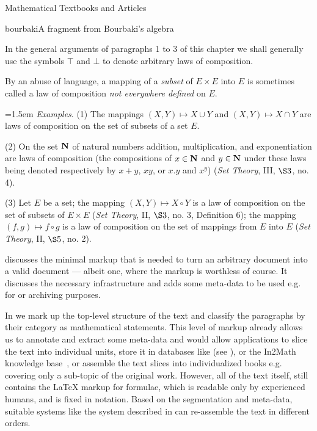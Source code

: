 \begin{tchapter}[id=algebra,short=Textbooks and Articles]{Mathematical Textbooks and Articles}
\begin{myfig}{bourbaki}{A fragment from Bourbaki's algebra~}
{\begin{minipage}{11cm}
      In the general arguments of paragraphs 1 to 3 of this chapter we shall generally use
      the symbols $\top$ and $\bot$ to denote arbitrary laws of composition.
      
      By an abuse of language, a mapping of a {\emph{subset}} of $E\times E$ into $E$ is
      sometimes called a law of composition {\emph{not everywhere defined}} on $E$.
      \vspace{1em}

      \strut\hfill
      \begin{minipage}{11cm}\parindent=1.5em
        {\emph{Examples}}. (1) The mappings $(X,Y)\mapsto X\cup Y$ and $(X,Y)\mapsto
        X\cap Y$ are laws of composition on the set of subsets of a set $E$.
        
        (2) On the set $\bf N$ of natural numbers addition, multiplication, and
        exponentiation are laws of composition (the compositions of $x\in{\bf N}$
        and $y\in{\bf N}$ under these laws being denoted respectively by $x+y$,
        $xy$, or $x.y$ and $x^y$) ({\em{Set Theory}}, III, $\S3$, no. 4).
  
        (3) Let $E$ be a set; the mapping $(X,Y)\mapsto X\circ Y$ is a law of
        composition on the set of subsets of $E\times E$ ({\emph{Set Theory}}, II,
        $\S3$, no. 3, Definition 6); the mapping $(f,g)\mapsto f\circ g$ is a law
        of composition on the set of mappings from $E$ into $E$ ({\emph{Set Theory}},
        II, $\S5$, no. 2).
      \end{minipage}
    \end{minipage}}
\end{myfig}

{} discusses the minimal markup that is needed to turn an
arbitrary document into a valid {\omdoc} document --- albeit one, where the markup is
worthless of course. It discusses the necessary {\xml} infrastructure and adds some
meta-data to be used e.g. for {} or
archiving purposes.

In {} we mark up the top-level structure of the text and
classify the paragraphs by their category as mathematical statements.  This level
of markup already allows us to annotate and extract some meta-data and would allow
applications to slice the text into individual units, store it in databases like
{\mbase} (see {}), or the In2Math knowledge
base~\cite{Dahn:sbt01,BauBlo:adtmpd01}, or assemble the text slices into
individualized books e.g. covering only a sub-topic of the original work.
However, all of the text itself, still contains the {\LaTeX} markup for formulae,
which is readable only by experienced humans, and is fixed in notation.  Based on
the segmentation and meta-data, suitable systems like the {\activemath} system
described in {} can re-assemble the text in different orders.
   

\end{tchapter}
